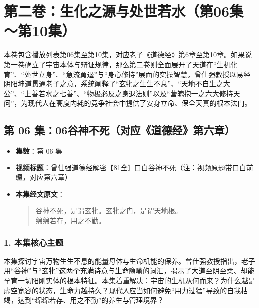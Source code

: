 \section*{第二卷：生化之源与处世若水（第06集～第10集）}

本卷包含播放列表第06集至第10集，对应老子《道德经》第6章至第10章。如果说第一卷确立了宇宙本体与辩证规律，那么第二卷则全面展开了天道在“生机化育”、“处世立身”、“急流勇退”与“身心修持”层面的实操智慧。曾仕强教授以易经阴阳坤道贯通老子之意，系统阐释了“玄牝之生生不息”、“天地不自生之大公”、“上善若水之七善”、“物极必反之身退法则”以及“营魄抱一之六大修持天问”，为现代人在高度内耗的竞争社会中提供了安身立命、保全天真的根本法门。

\clearpage

\subsection{第 06 集：06谷神不死（对应《道德经》第六章）}
\label{sec:ep06}

\begin{itemize}
    \item \textbf{集数}：第 06 集
    \item \textbf{视频标题}：曾仕强道德经解密【81全】口白谷神不死（注：视频原题带口白前缀，对应第六章）
    
    \item \textbf{本集经文原文}：
    \begin{quote}\kaishu
    谷神不死，是谓玄牝。玄牝之门，是谓天地根。\\
    绵绵若存，用之不勤。
    \end{quote}
\end{itemize}

\subsubsection{1. 本集核心主题}
本集探讨宇宙万物生生不息的能量母体与生命机能的保养。曾仕强教授指出，老子用“谷神”与“玄牝”这两个充满诗意与生命隐喻的词汇，揭示了大道至阴至柔、却能孕育一切阳刚实体的根本特征。本集着重解决：宇宙的生机从何而来？为什么越是虚空宽容的状态，生命力越持久？现代人应当如何避免“用力过猛”导致的自我枯竭，达到“绵绵若存、用之不勤”的养生与管理境界？

